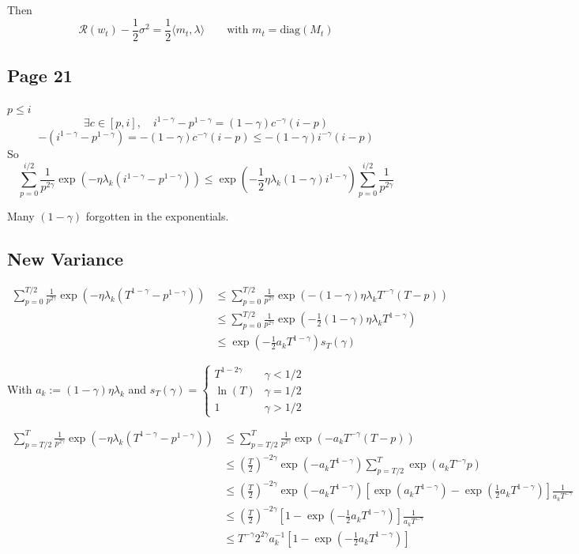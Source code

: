 \documentclass{article}
\begin{document}
Then \[\mathcal R(w_t) - \frac{1}{2}\sigma^2 = \frac{1}{2}\langle m_t, \lambda\rangle \qquad \text{with } m_t = \mathrm{diag}(M_t) \]

\subsection{Page 21}

$p\leq i$ 
\[
\exists c \in [p,i], \quad i^{1-\gamma} - p^{1-\gamma} = (1-\gamma)c^{-\gamma} (i-p)
\]
\[
-(i^{1-\gamma} - p^{1-\gamma}) = - (1-\gamma)c^{-\gamma} (i-p) \leq  - (1-\gamma)i^{-\gamma} (i-p)
\]
So
\[
\sum_{p=0}^{i/2} \frac{1}{p^{2\gamma}} \exp(-\eta \lambda_k(i^{1-\gamma} - p^{1-\gamma})) \leq  \exp\left(-\frac{1}{2}\eta \lambda_k(1-\gamma)i^{1-\gamma}\right) \sum_{p=0}^{i/2} \frac{1}{p^{2\gamma}}
\]

Many $(1-\gamma)$ forgotten in the exponentials.


\subsection{New Variance}

\begin{align*}
\sum_{p=0}^{T/2} \frac{1}{p^{2\gamma}} \exp\left(-\eta \lambda_k(T^{1-\gamma} - p^{1-\gamma})\right) 
&\leq  \sum_{p=0}^{T/2} \frac{1}{p^{2\gamma}} \exp\left(-(1-\gamma)\eta \lambda_kT^{-\gamma}(T- p)\right) \\
& \leq \sum_{p=0}^{T/2} \frac{1}{p^{2\gamma}} \exp\left(-\frac{1}{2}(1-\gamma)\eta \lambda_kT^{1-\gamma}\right) \\
& \leq \exp\left(-\frac{1}{2}a_kT^{1-\gamma} \right) s_T(\gamma)
\end{align*}

With $a_k := (1-\gamma) \eta \lambda_k$ and $s_T(\gamma) = \left\{ \begin{array}{ll}
T^{1-2\gamma}  & \gamma < 1/2\\
\ln(T) & \gamma = 1/2\\
1 & \gamma >1/2
\end{array}\right.$


\begin{align*}
\sum_{p=T/2}^{T} \frac{1}{p^{2\gamma}} \exp\left(-\eta \lambda_k(T^{1-\gamma} - p^{1-\gamma})\right) 
&\leq  \sum_{p=T/2}^{T} \frac{1}{p^{2\gamma}} \exp\left(-a_kT^{-\gamma}(T- p)\right) \\
& \leq \left(\frac{T}{2}\right)^{-2\gamma} \exp\left(-a_kT^{1-\gamma}\right)\sum_{p=T/2}^{T}  \exp\left(a_kT^{-\gamma}p\right) \\
& \leq \left(\frac{T}{2}\right)^{-2\gamma} \exp\left(-a_kT^{1-\gamma}\right) \left[ \exp\left(a_kT^{1-\gamma}\right) - \exp\left(\frac{1}{2}a_kT^{1-\gamma}\right) \right]\frac{1}{a_kT^{-\gamma}} \\
& \leq \left(\frac{T}{2}\right)^{-2\gamma}  \left[ 1-\exp\left(-\frac{1}{2}a_kT^{1-\gamma}\right)  \right] \frac{1}{a_kT^{-\gamma}}\\
& \leq T^{-\gamma} 2^{2\gamma} a_k^{-1} \left[ 1-\exp\left(-\frac{1}{2}a_kT^{1-\gamma}\right)  \right] 
\end{align*}
\end{document}
